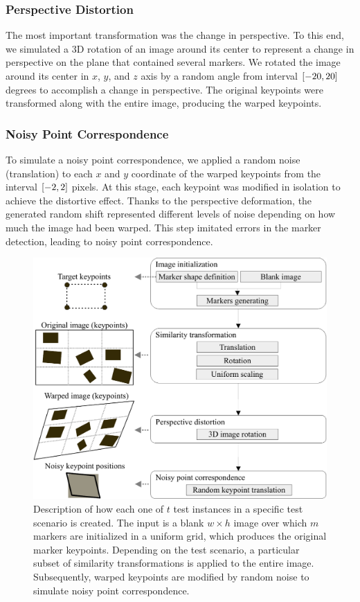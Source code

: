 \subsubsection{Perspective Distortion}

The most important transformation was the change in perspective. To this end, we simulated a $3$D rotation of an image around its center to represent a change in perspective on the plane that contained several markers. We rotated the image around its center in $x$, $y$, and $z$ axis by a random angle from interval $\left[ {-20, 20} \right]$ degrees to accomplish a change in perspective. The original keypoints were transformed along with the entire image, producing the warped keypoints.

\subsubsection{Noisy Point Correspondence}

To simulate a noisy point correspondence, we applied a random noise (translation) to each $x$ and $y$ coordinate of the warped keypoints from the interval $\left[ {-2, 2} \right]$ pixels. At this stage, each keypoint was modified in isolation to achieve the distortive effect. Thanks to the perspective deformation, the generated random shift represented different levels of noise depending on how much the image had been warped. This step imitated errors in the marker detection, leading to noisy point correspondence.

\begin{figure}[t]
    \centering
    \includegraphics[width=0.7\linewidth]{figures/homography/dataset_generating.pdf}
    \caption[Description of creation of test scenarios]{Description of how each one of $t$ test instances in a specific test scenario is created. The input is a blank $w \times h$ image over which $m$ markers are initialized in a uniform grid, which produces the original marker keypoints. Depending on the test scenario, a particular subset of similarity transformations is applied to the entire image. Subsequently, warped keypoints are modified by random noise to simulate noisy point correspondence.}
    \label{fig:DatasetGenerating}
\end{figure}

